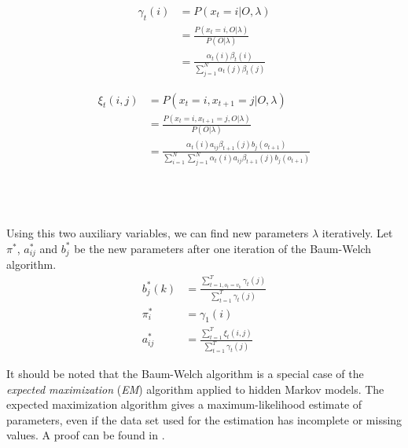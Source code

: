 \begin{minipage}{0.45\textwidth}
	\begin{align*}
	\gamma_t(i) &= P(x_t = i|O,\lambda) \\
	&= \frac{P(x_t = i, O|\lambda)}{P(O|\lambda)} \\
	&=\frac{\alpha_t(i)\beta_t(i)}{\sum_{j = 1}^{N} \alpha_t(j) \beta_t(j)} 
	\end{align*}
\end{minipage}
\hfill
\begin{minipage}{0.45\textwidth}
	\begin{align*}
	\xi_t(i, j) &= P(x_t = i,x_{t + 1} = j|O,\lambda) \\
	&= \frac{P(x_t = i,x_{t + 1} = j, O|\lambda)}{P(O|\lambda)} \\
	&=\frac{\alpha_t(i)a_{ij}\beta_{t + 1}(j)b_j(o_{t + 1})}{\sum_{i = 1}^{N} \sum_{j = 1}^{N} \alpha_t(i)a_{ij}\beta_{t + 1}(j)b_j(o_{t + 1})}
	\end{align*}
\end{minipage}
\\ \\ \\
Using this two auxiliary variables, we can find new parameters $\lambda$ iteratively. Let $\pi^*$, $a_{ij}^*$ and $b_{j}^*$ be the new parameters after one iteration of the Baum-Welch algorithm. 
\begin{align*}
b^*_j(k) &= \frac{\sum_{t = 1, o_t = v_k}^{T} \gamma_t(j)}{\sum_{t = 1}^{T} \gamma_t(j)} \\
\pi^*_i &= \gamma_1(i) \\
a_{ij}^*  &= \frac{\sum_{t = 1}^{T} \xi_t(i, j)}{\sum_{t = 1}^{T} \gamma_t(j)} 
\end{align*}

It should be noted that the Baum-Welch algorithm is a special case of the \textit{expected maximization} (\textit{EM}) algorithm applied to hidden Markov models. The expected maximization algorithm gives a maximum-likelihood estimate of parameters, even if the data set used for the estimation has incomplete or missing values. A proof can be found in \cite{bilmes1998gentle}. 